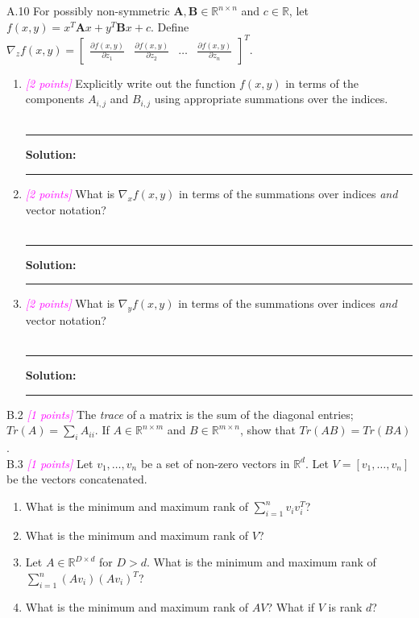 \documentclass{article}
\newcommand{\field}[1]{\mathbb{#1}}
\newcommand{\1}{\mathbf{1}}
\newcommand{\R}{\field{R}} %
\newcommand{\mat}[1]{\boldsymbol{#1}} %
\newcommand{\points}[1]{\small\textcolor{magenta}{\emph{[#1 points]}} \normalsize}
\begin{document}
A.10 For possibly non-symmetric $\mat{A}, \mat{B} \in \R^{n \times n}$ and $c \in \R$, let $f(x, y) = x^T \mat{A} x + y^T \mat{B} x + c$. Define $\nabla_z f(x,y) = \begin{bmatrix} \frac{\partial f(x,y)}{\partial z_1} & \frac{\partial f(x,y)}{\partial z_2} & \dots & \frac{\partial f(x,y)}{\partial z_n} \end{bmatrix}^T$.  
\begin{enumerate}
	\item \points{2} Explicitly write out the function $f(x, y)$ in terms of the components $A_{i,j}$ and $B_{i,j}$ using appropriate summations over the indices.
	\\
\\
    \noindent\rule{\textwidth}{1pt}
    {\bf Solution:}\\

    \noindent\rule{\textwidth}{1pt}
	\item \points{2} What is $\nabla_x f(x,y)$ in terms of the summations over indices \emph{and} vector notation?\\
\\
    \noindent\rule{\textwidth}{1pt}
    {\bf Solution:}\\

    \noindent\rule{\textwidth}{1pt}
	\item \points{2} What is $\nabla_y f(x,y)$ in terms of the summations over indices \emph{and} vector notation?
	\\
\\
    \noindent\rule{\textwidth}{1pt}
    {\bf Solution:}\\

    \noindent\rule{\textwidth}{1pt}
\end{enumerate}

B.2 \points{1} The \textit{trace} of a matrix is the sum of the diagonal entries; $Tr(A) = \sum_i A_{ii}$. If $A\in\mathbb{R}^{n\times m}$ and $B\in\mathbb{R}^{m\times n}$, show that $Tr(AB) = Tr(BA)$.\\

B.3 \points{1} Let $v_1,\dots,v_n$ be a set of non-zero vectors in $\mathbb{R}^d$. Let $V = [v_1,\dots,v_n]$ be the vectors concatenated. 
    \begin{enumerate}
        \item What is the minimum and maximum rank of $\sum_{i=1}^n v_i v_i^T$?
        \item What is the minimum and maximum rank of $V$?
        \item Let $A \in \mathbb{R}^{D \times d}$ for $D > d$. What is the minimum and maximum rank of $\sum_{i=1}^n (A v_i) (A v_i)^T$?
        \item What is the minimum and maximum rank of $AV$? What if $V$ is rank $d$?
    \end{enumerate}
\end{document}
